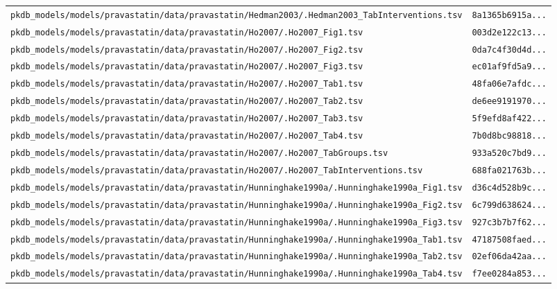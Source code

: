 \documentclass{article}
\begin{document}
\begin{longtable}{ll}
\texttt{pkdb\_models/models/pravastatin/data/pravastatin/Hedman2003/.Hedman2003\_TabInterventions.tsv} & \texttt{8a1365b6915a...} \\
\texttt{pkdb\_models/models/pravastatin/data/pravastatin/Ho2007/.Ho2007\_Fig1.tsv} & \texttt{003d2e122c13...} \\
\texttt{pkdb\_models/models/pravastatin/data/pravastatin/Ho2007/.Ho2007\_Fig2.tsv} & \texttt{0da7c4f30d4d...} \\
\texttt{pkdb\_models/models/pravastatin/data/pravastatin/Ho2007/.Ho2007\_Fig3.tsv} & \texttt{ec01af9fd5a9...} \\
\texttt{pkdb\_models/models/pravastatin/data/pravastatin/Ho2007/.Ho2007\_Tab1.tsv} & \texttt{48fa06e7afdc...} \\
\texttt{pkdb\_models/models/pravastatin/data/pravastatin/Ho2007/.Ho2007\_Tab2.tsv} & \texttt{de6ee9191970...} \\
\texttt{pkdb\_models/models/pravastatin/data/pravastatin/Ho2007/.Ho2007\_Tab3.tsv} & \texttt{5f9efd8af422...} \\
\texttt{pkdb\_models/models/pravastatin/data/pravastatin/Ho2007/.Ho2007\_Tab4.tsv} & \texttt{7b0d8bc98818...} \\
\texttt{pkdb\_models/models/pravastatin/data/pravastatin/Ho2007/.Ho2007\_TabGroups.tsv} & \texttt{933a520c7bd9...} \\
\texttt{pkdb\_models/models/pravastatin/data/pravastatin/Ho2007/.Ho2007\_TabInterventions.tsv} & \texttt{688fa021763b...} \\
\texttt{pkdb\_models/models/pravastatin/data/pravastatin/Hunninghake1990a/.Hunninghake1990a\_Fig1.tsv} & \texttt{d36c4d528b9c...} \\
\texttt{pkdb\_models/models/pravastatin/data/pravastatin/Hunninghake1990a/.Hunninghake1990a\_Fig2.tsv} & \texttt{6c799d638624...} \\
\texttt{pkdb\_models/models/pravastatin/data/pravastatin/Hunninghake1990a/.Hunninghake1990a\_Fig3.tsv} & \texttt{927c3b7b7f62...} \\
\texttt{pkdb\_models/models/pravastatin/data/pravastatin/Hunninghake1990a/.Hunninghake1990a\_Tab1.tsv} & \texttt{47187508faed...} \\
\texttt{pkdb\_models/models/pravastatin/data/pravastatin/Hunninghake1990a/.Hunninghake1990a\_Tab2.tsv} & \texttt{02ef06da42aa...} \\
\texttt{pkdb\_models/models/pravastatin/data/pravastatin/Hunninghake1990a/.Hunninghake1990a\_Tab4.tsv} & \texttt{f7ee0284a853...} \\

\end{longtable}
\end{document}

